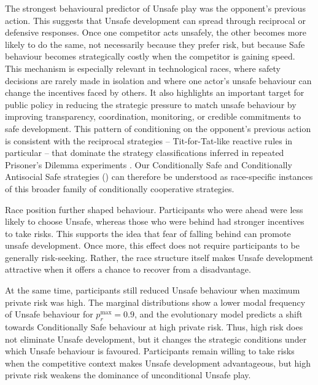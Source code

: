 \documentclass[pdflatex,sn-mathphys-ay]{sn-jnl}
\theoremstyle{thmstyleone}
\theoremstyle{thmstyletwo}
\theoremstyle{thmstylethree}
\begin{document}
The strongest behavioural predictor of Unsafe play was the opponent's previous action. This suggests that Unsafe development can spread through reciprocal or defensive responses. Once one competitor acts unsafely, the other becomes more likely to do the same, not necessarily because they prefer risk, but because Safe behaviour becomes strategically costly when the competitor is gaining speed. This mechanism is especially relevant in technological races, where safety decisions are rarely made in isolation and where one actor's unsafe behaviour can change the incentives faced by others. It also highlights an important target for public policy in reducing the strategic pressure to match unsafe behaviour by improving transparency, coordination, monitoring, or credible commitments to safe development. This pattern of conditioning on the opponent's previous action is consistent with the reciprocal strategies -- Tit-for-Tat-like reactive rules in particular -- that dominate the strategy classifications inferred in repeated Prisoner's Dilemma experiments \citep{dal2018determinants,monteroPorras2022inferringStrategies}. Our Conditionally Safe and Conditionally Antisocial Safe strategies () can therefore be understood as race-specific instances of this broader family of conditionally cooperative strategies.

Race position further shaped behaviour. Participants who were ahead were less likely to choose Unsafe, whereas those who were behind had stronger incentives to take risks. This supports the idea that fear of falling behind can promote unsafe development. Once more, this effect does not require participants to be generally risk-seeking. Rather, the race structure itself makes Unsafe development attractive when it offers a chance to recover from a disadvantage.

At the same time, participants still reduced Unsafe behaviour when maximum private risk was high. The marginal distributions show a lower modal frequency of Unsafe behaviour for $p_r^{\max}=0.9$, and the evolutionary model predicts a shift towards Conditionally Safe behaviour at high private risk. Thus, high risk does not eliminate Unsafe development, but it changes the strategic conditions under which Unsafe behaviour is favoured. Participants remain willing to take risks when the competitive context makes Unsafe development advantageous, but high private risk weakens the dominance of unconditional Unsafe play.
\end{document}
